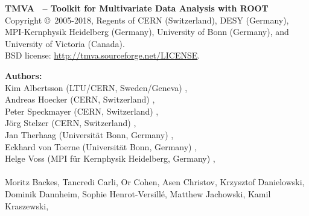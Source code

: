 \begin{center}
{\small\sf
{\sf\bfseries TMVA \TMVAVersion\ -- Toolkit for Multivariate Data Analysis with ROOT}  \\
Copyright 
\copyright\  2005-2018, Regents of 
CERN (Switzerland),  
DESY (Germany),
MPI-Kernphysik Heidelberg (Germany),
University of Bonn (Germany),
and University of Victoria (Canada). \\
BSD license: \url{http://tmva.sourceforge.net/LICENSE}. 

{\sf\bfseries Authors:} \\
Kim Albertsson (LTU/CERN, Sweden/Geneva) ,\\
Andreas Hoecker (CERN, Switzerland) , \\
Peter Speckmayer (CERN, Switzerland) , \\
J\"org Stelzer (CERN, Switzerland) ,\\
Jan Therhaag (Universit\"at Bonn, Germany) , \\
Eckhard von Toerne (Universit\"at Bonn, Germany) ,\\
Helge Voss (MPI f\"ur Kernphysik Heidelberg, Germany) ,\\
\hspace{0.5cm} \\
Moritz Backes, %
Tancredi Carli, %
Or Cohen, %
Asen Christov, %
Krzysztof Danielowski, %
Dominik Dannheim, %
Sophie Henrot-Versill\'e, %
Matthew Jachowski, %
Kamil Kraszewski, %
}
\end{center}
